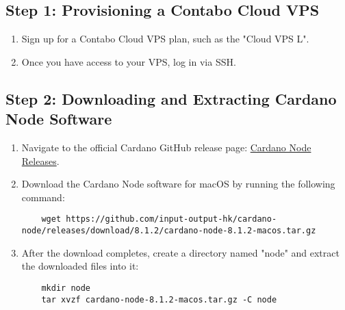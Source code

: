 \subsection{Step 1: Provisioning a Contabo Cloud VPS}
\begin{enumerate}
    \item Sign up for a Contabo Cloud VPS plan, such as the "Cloud VPS L".
    \item Once you have access to your VPS, log in via SSH.
\end{enumerate}

\subsection{Step 2: Downloading and Extracting Cardano Node Software}
\begin{enumerate}
    \item Navigate to the official Cardano GitHub release page: \href{https://github.com/input-output-hk/cardano-node/releases/tag/8.1.2}{Cardano Node Releases}.
    \item Download the Cardano Node software for macOS by running the following command:
    \begin{verbatim}
    wget https://github.com/input-output-hk/cardano-node/releases/download/8.1.2/cardano-node-8.1.2-macos.tar.gz
    \end{verbatim}
    \item After the download completes, create a directory named "node" and extract the downloaded files into it:
    \begin{verbatim}
    mkdir node
    tar xvzf cardano-node-8.1.2-macos.tar.gz -C node
    \end{verbatim}
\end{enumerate}

